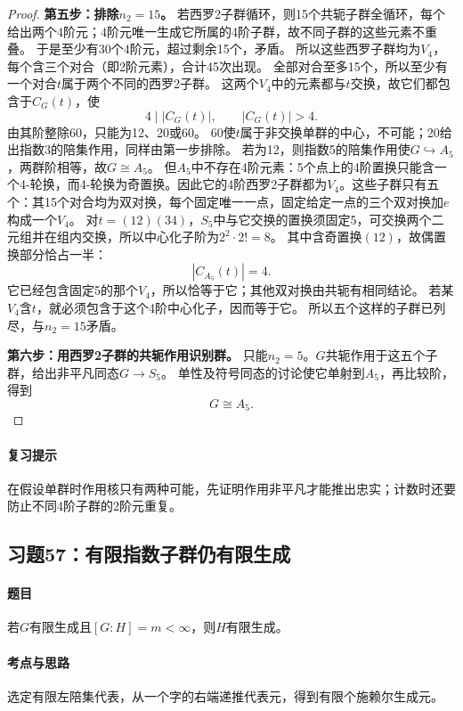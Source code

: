 \begin{proof}
\textbf{第五步：排除$n_2=15$。}
若西罗2子群循环，则15个共轭子群全循环，每个给出两个4阶元；4阶元唯一生成它所属的4阶子群，故不同子群的这些元素不重叠。
于是至少有30个4阶元，超过剩余15个，矛盾。
所以这些西罗子群均为$V_4$，每个含三个对合（即2阶元素），合计45次出现。
全部对合至多15个，所以至少有一个对合$t$属于两个不同的西罗2子群。
这两个$V_4$中的元素都与$t$交换，故它们都包含于$C_G(t)$，使
\[
4\mid|C_G(t)|,\qquad|C_G(t)|>4.
\]
由其阶整除60，只能为12、20或60。
60使$t$属于非交换单群的中心，不可能；20给出指数3的陪集作用，同样由第一步排除。
若为12，则指数5的陪集作用使$G\hookrightarrow A_5$，两群阶相等，故$G\cong A_5$。
但$A_5$中不存在4阶元素：5个点上的4阶置换只能含一个4-轮换，而4-轮换为奇置换。因此它的4阶西罗2子群都为$V_4$。这些子群只有五个：其15个对合均为双对换，每个固定唯一一点，固定给定一点的三个双对换加$e$构成一个$V_4$。
对$t=(12)(34)$，$S_5$中与它交换的置换须固定5，可交换两个二元组并在组内交换，所以中心化子阶为$2^2\cdot2!=8$。
其中含奇置换$(12)$，故偶置换部分恰占一半：
\[
|C_{A_5}(t)|=4.
\]
它已经包含固定5的那个$V_4$，所以恰等于它；其他双对换由共轭有相同结论。
若某$V_4$含$t$，就必须包含于这个4阶中心化子，因而等于它。
所以五个这样的子群已列尽，与$n_2=15$矛盾。

\textbf{第六步：用西罗2子群的共轭作用识别群。}
只能$n_2=5$。$G$共轭作用于这五个子群，给出非平凡同态$G\to S_5$。
单性及符号同态的讨论使它单射到$A_5$，再比较阶，得到
\[
G\cong A_5.
\]
\end{proof}

\paragraph{复习提示}
在假设单群时作用核只有两种可能，先证明作用非平凡才能推出忠实；计数时还要防止不同4阶子群的2阶元重复。


\subsection{习题57：\texorpdfstring{有限指数子群仍有限生成}{有限指数子群仍有限生成}}
\label{ex:2:57}

\paragraph{题目}
若$G$有限生成且$[G:H]=m<\infty$，则$H$有限生成。

\paragraph{考点与思路}
选定有限左陪集代表，从一个字的右端递推代表元，得到有限个施赖尔生成元。

